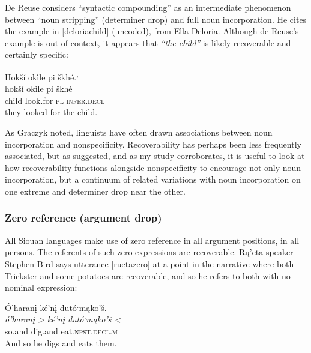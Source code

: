 \documentclass[output=paper]{LSP/langsci}
\begin{document}
De Reuse considers “syntactic compounding” as an intermediate phenomenon between “noun stripping” (determiner drop) and full noun incorporation. He cites the example in \ref{deloriachild} (uncoded), from Ella Deloria. Although de Reuse’s example is out of context, it appears that \emph{“the child”} is likely recoverable and certainly specific:

\ea\label{deloriachild}
 	Hokší okìle pi škhé.\footnotemark\textsuperscript{,} \footnotemark\\
\gll	hokší		okìle		pi			škhé\\
	child		look.for	\textsc{pl}		\textsc{infer.decl}\\
\glt	they looked for the child. 
\z

	As Graczyk noted, linguists have often drawn associations between noun incorporation and nonspecificity. Recoverability has perhaps been less frequently associated, but as \citet{deReuse1994} suggested, and as my study corroborates, it is useful to look at how recoverability functions alongside nonspecificity to encourage not only noun incorporation, but a continuum of related variations with noun incorporation on one extreme and determiner drop near the other.
	
\subsubsection{Zero reference (argument drop)}\label{zeroreference}

	All Siouan languages make use of zero reference in all argument positions, in all persons. The referents of such zero expressions are recoverable. Rų’eta speaker Stephen Bird says utterance \ref{ruetazero} at a point in the narrative where both Trickster and some potatoes are recoverable, and so he refers to both with no nominal expression:
	
\ea\label{ruetazero}
 	Ó’haranį ké’nį dutóˑmąko’š.\footnotemark\\
\gll 	\emph{ó’haranį >}	\emph{ké’nį}		\emph{dutóˑmąko’š <}\\
	so.and		dig.and		eat.\textsc{npst.decl.m}\\
\glt	And so he digs and eats them.
\z
\end{document}
